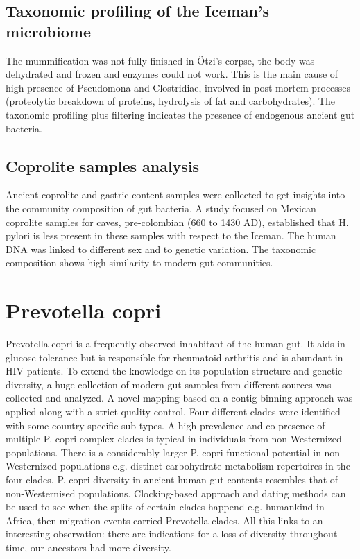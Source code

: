 	\subsection{Taxonomic profiling of the Iceman’s microbiome}
	The mummification was not fully finished in Ötzi’s corpse, the body was dehydrated and frozen and enzymes could not work.
	This is the main cause of high presence of Pseudomona and Clostridiae, involved in post-mortem processes (proteolytic breakdown of proteins, hydrolysis of fat and carbohydrates).
	The taxonomic profiling plus filtering indicates the presence of endogenous ancient gut bacteria.

	\subsection{Coprolite samples analysis}
	Ancient coprolite and gastric content samples were collected to get insights into the community composition of gut bacteria.
	A study focused on Mexican coprolite samples for caves, pre-colombian (660 to 1430 AD), established that H. pylori is less present in these samples with respect to the Iceman.
	The human DNA was linked to different sex and to genetic variation.
	The taxonomic composition shows high similarity to modern gut communities.

\section{Prevotella copri}
Prevotella copri is a frequently observed inhabitant of the human gut.
It aids in glucose tolerance but is responsible for rheumatoid arthritis and is abundant in HIV patients.
To extend the knowledge on its population structure and genetic diversity, a huge collection of modern gut samples from different sources was collected and analyzed.
A novel mapping based on a contig binning approach was applied along with a strict quality control.
Four different clades were identified with some country-specific sub-types.
A high prevalence and co-presence of multiple P. copri complex clades is typical in individuals from non-Westernized populations.
There is a considerably larger P. copri functional potential in non-Westernized populations e.g. distinct carbohydrate metabolism repertoires in the four clades.
P. copri diversity in ancient human gut contents resembles that of non-Westernised populations.
Clocking-based approach and dating methods can be used to see when the splits of certain clades happend e.g. humankind in Africa, then migration events carried Prevotella clades.
All this links to an interesting observation: there are indications for a loss of diversity throughout time, our ancestors had more diversity.

